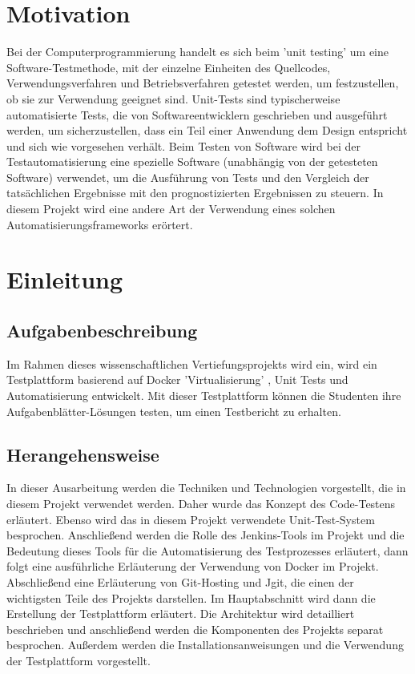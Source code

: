 \documentclass[a4paper,12pt,oneside]{book}
\begin{document}
	
\tableofcontents
\newpage
{}
\listoffigures
\newpage
{}
\lstlistoflistings
\newpage
\chapter{Motivation}
Bei der Computerprogrammierung handelt es sich beim 'unit testing' um eine Software-Testmethode, mit der einzelne Einheiten des Quellcodes,  Verwendungsverfahren und Betriebsverfahren getestet werden, um festzustellen, ob sie zur Verwendung geeignet sind.
\newline
Unit-Tests sind typischerweise automatisierte Tests, die von Softwareentwicklern geschrieben und ausgeführt werden, um sicherzustellen, dass ein Teil einer Anwendung dem Design entspricht und sich wie vorgesehen verhält.
\newline
Beim Testen von Software wird bei der Testautomatisierung eine spezielle Software (unabhängig von der getesteten Software) verwendet, um die Ausführung von Tests und den Vergleich der tatsächlichen Ergebnisse mit den prognostizierten Ergebnissen zu steuern.
\newline
In diesem Projekt wird eine andere Art der Verwendung eines solchen Automatisierungsframeworks erörtert.
\chapter{Einleitung}
\section{Aufgabenbeschreibung}

Im Rahmen dieses wissenschaftlichen Vertiefungsprojekts wird ein, wird ein Testplattform basierend auf Docker 'Virtualisierung' , Unit Tests und Automatisierung entwickelt.
\newline
Mit dieser Testplattform können die Studenten ihre Aufgabenblätter-Lösungen testen, um einen Testbericht zu erhalten.
\section{Herangehensweise}
In dieser Ausarbeitung werden die Techniken und Technologien vorgestellt, die in diesem Projekt verwendet werden. Daher wurde das Konzept des Code-Testens erläutert. Ebenso wird das in diesem Projekt verwendete Unit-Test-System besprochen. Anschließend werden die Rolle des Jenkins-Tools im Projekt und die Bedeutung dieses Tools für die Automatisierung des Testprozesses erläutert, dann folgt eine ausführliche Erläuterung der Verwendung von Docker im Projekt. Abschließend eine Erläuterung von Git-Hosting und Jgit, die einen der wichtigsten Teile des Projekts darstellen.
\newline
Im Hauptabschnitt wird dann die Erstellung der Testplattform erläutert. Die Architektur wird detailliert beschrieben und anschließend werden die Komponenten des Projekts separat besprochen. Außerdem werden die Installationsanweisungen und die Verwendung der Testplattform vorgestellt.
\end{document}
